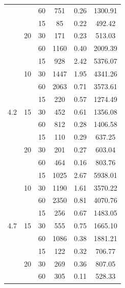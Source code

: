 \begin{table}[htbp]
\begin{tabular}{S[table-format=1.1] S[table-format=2] S S[table-format=4] S[table-format=1.4] S[table-format=4.2]}
        &       & 60 & 751 & 0.26 & 1300.91\\
        &       & 15 & 85 & 0.22 & 492.42\\
        & 20    & 30 & 171 & 0.23 & 513.03\\
        &       & 60 & 1160 & 0.40 & 2009.39\\
\midrule
        &       & 15 & 928 & 2.42 & 5376.07\\
        & 10    & 30 & 1447 & 1.95 & 4341.26\\
        &       & 60 & 2063 & 0.71 & 3573.61\\
        &       & 15 & 220 & 0.57 & 1274.49\\
4.2     & 15    & 30 & 452 & 0.61 & 1356.08\\
        &       & 60 & 812 & 0.28 & 1406.58\\
        &       & 15 & 110 & 0.29 & 637.25\\
        & 20    & 30 & 201 & 0.27 & 603.04\\
        &       & 60 & 464 & 0.16 & 803.76\\
\midrule
        &       & 15 & 1025 & 2.67 & 5938.01\\
        & 10    & 30 & 1190 & 1.61 & 3570.22\\
        &       & 60 & 2350 & 0.81 & 4070.76\\
        &       & 15 & 256 & 0.67 & 1483.05\\
4.7     & 15    & 30 & 555 & 0.75 & 1665.10\\
        &       & 60 & 1086 & 0.38 & 1881.21\\
        &       & 15 & 122 & 0.32 & 706.77\\
        & 20    & 30 & 269 & 0.36 & 807.05\\
        &       & 60 & 305 & 0.11 & 528.33\\
\bottomrule
\end{tabular}
\end{table}


